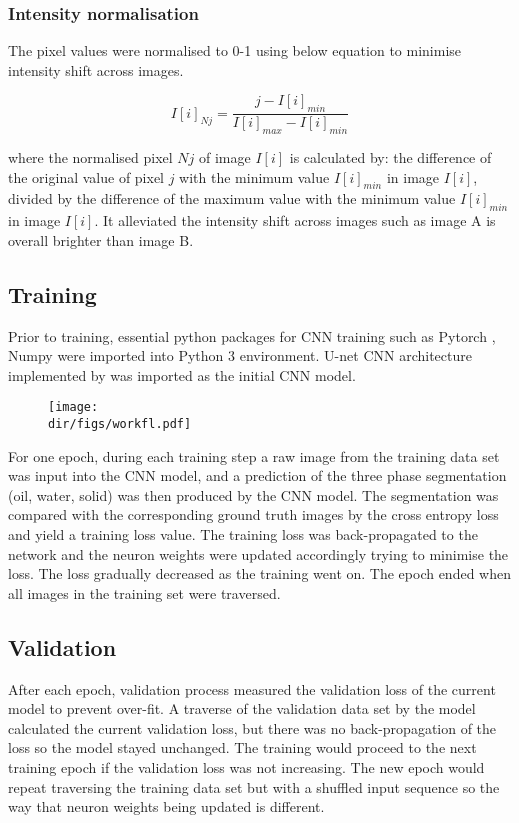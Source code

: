 \subsubsection{Intensity normalisation}
The pixel values were normalised to 0-1 using below equation to minimise intensity shift across images.

\begin{equation}
I[i]_{Nj}=\frac{j-I[i]_{min}}{I[i]_{max}-I[i]_{min}}
\end{equation}

where the normalised pixel $Nj$ of image $I[i]$ is calculated by: the difference of the original value of pixel $j$ with the minimum value $I[i]_{min}$ in image $I[i]$, divided by the difference of the maximum value with the minimum value $I[i]_{min}$ in image $I[i]$. It alleviated the intensity shift across images such as image A is overall brighter than image B.

\subsection{Training}
Prior to training, essential python packages for CNN training such as Pytorch \citep{paszke2017automatic}, Numpy \citep{van2011numpy} were imported into Python 3 environment. U-net CNN architecture implemented by \citet{Jorispytorch} was imported as the initial CNN model. 

\begin{figure}[htbp]
  \centering
  \texttt{[image: \\dir/figs/workfl.pdf]}
  \caption{}
  \label{workfl}
\end{figure}

For one epoch, during each training step a raw image from the training data set was input into the CNN model, and a prediction of the three phase segmentation (oil, water, solid) was then produced by the CNN model. The segmentation was compared with the corresponding ground truth images by the cross entropy loss and yield a training loss value. The training loss was back-propagated to the network and the neuron weights were updated accordingly trying to minimise the loss. The loss gradually decreased as the training went on. The epoch ended when all images in the training set were traversed.

\subsection{Validation}
After each epoch, validation process measured the validation loss of the current model to prevent over-fit. A traverse of the validation data set by the model calculated the current validation loss, but there was no back-propagation of the loss so the model stayed unchanged. The training would proceed to the next training epoch if the validation loss was not increasing. The new epoch would repeat traversing the training data set but with a shuffled input sequence so the way that neuron weights being updated is different.

